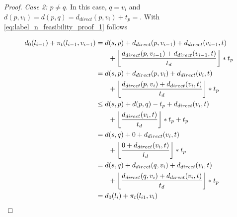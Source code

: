 \begin{proof}
	\emph{Case 2: $p \neq q$}. In this case, $q = v_i$ and $d(p,v_i) = d(p,q) = d_{direct}(p,v_i) + t_p = $. With \ref{eq:label_n_feasibility_proof_1} follows

	\begin{align}
		\begin{split}\label{eq:label_n_feasibility_proof_4}
			d_0(l_{i-1}) + \pi_t(l_{i-1},v_{i-1}) &= d(s,p) + d_{direct}(p,v_{i-1}) + d_{direct}(v_{i-1},t)\\
			& \phantom{{}=1} + \floor*{ \frac{d_{direct}(p,v_{i-1}) + d_{direct}(v_{i-1},t)}{t_d} } * t_p\\
			&= d(s,p) + d_{direct}(p,v_{i}) + d_{direct}(v_{i},t)\\
			& \phantom{{}=1} + \floor*{ \frac{d_{direct}(p,v_{i}) + d_{direct}(v_{i},t)}{t_d} } * t_p\\
			&\le d(s,p) + d(p,q) - t_p + d_{direct}(v_{i},t)\\
			& \phantom{{}=1} + \floor*{ \frac{d_{direct}(v_{i},t)}{t_d} } * t_p + t_p\\
			&= d(s,q) + 0 + d_{direct}(v_{i},t)\\
			& \phantom{{}=1} + \floor*{ \frac{0 + d_{direct}(v_{i},t)}{t_d} } * t_p\\
			&= d(s,q) + d_{direct}(q,v_{i}) + d_{direct}(v_{i},t)\\
			& \phantom{{}=1} + \floor*{ \frac{d_{direct}(q,v_{i}) + d_{direct}(v_{i},t)}{t_d} } * t_p\\
			&= d_0(l_{i}) + \pi_t(l_{i1},v_{i})
		\end{split}
	\end{align}
\end{proof}


